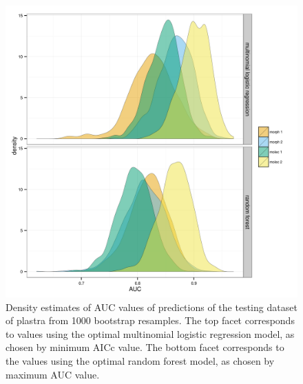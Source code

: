 \documentclass[12pt,letterpaper]{article}\usepackage{graphicx, color}
\begin{document}
\begin{figure}[ht]
  \centering
  \includegraphics[width = \textwidth]{figure/gen_res}
  \caption{Density estimates of AUC values of predictions of the testing dataset of plastra from 1000 bootstrap resamples. The top facet corresponds to values using the optimal multinomial logistic regression model, as chosen by minimum AICc value. The bottom facet corresponds to the values using the optimal random forest model, as chosen by maximum AUC value.}
  \label{fig:gen_res}
\end{figure}
\end{document}
